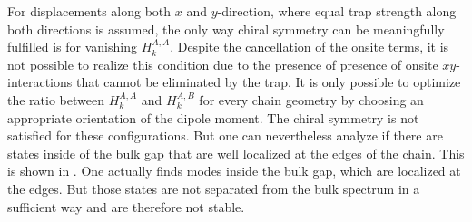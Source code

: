 For displacements along both $x$ and $y$-direction, where equal trap strength along both directions is assumed, the only way chiral symmetry can be meaningfully fulfilled is for vanishing $H_k^{A,A}$. Despite the cancellation of the onsite terms, it is not possible to realize this condition due to the presence of presence of onsite $xy$-interactions that cannot be eliminated by the trap. It is only possible to optimize the ratio between $H_k^{A,A}$ and $H_k^{A,B}$ for every chain geometry by choosing an appropriate orientation of the dipole moment. 
The chiral symmetry is not satisfied for these configurations. But one can nevertheless analyze if there are states inside of the bulk gap that are well localized at the edges of the chain. This is shown in . One actually finds modes inside the bulk gap, which are localized at the edges. But those states are not separated from the bulk spectrum in a sufficient way and are therefore not stable.  

